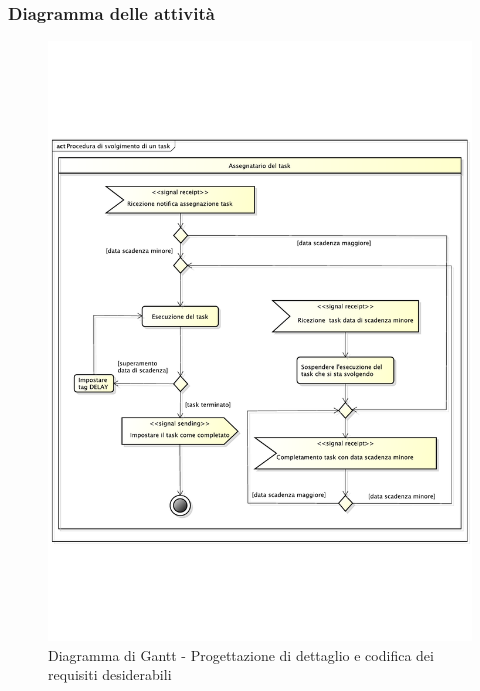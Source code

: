		\subsubsection{Diagramma delle attività} %
		\label{ssub:diagramma_delle_attivita}
			\begin{figure}[htbp]
				\centering
				\includegraphics[width=14cm]{images/proc_svolgimento_task.pdf}
				\caption{Diagramma di Gantt - Progettazione di dettaglio e codifica dei requisiti desiderabili}
				\label{fig:gantt_prog_dett_cod_requisiti_desiderabili}				
			\end{figure}
	
